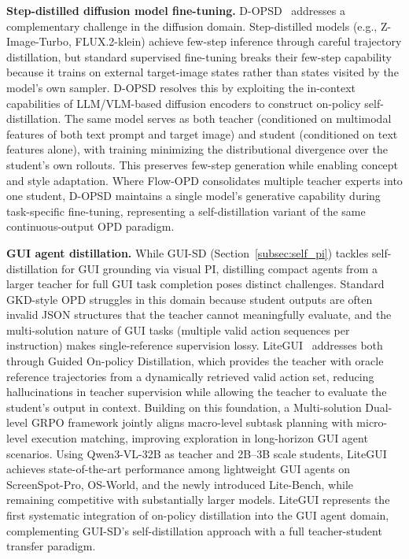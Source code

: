 \documentclass{article} %
\begin{document}
\textbf{Step-distilled diffusion model fine-tuning.} D-OPSD~\citep{jiang2026dopsd} addresses a complementary challenge in the diffusion domain. Step-distilled models (e.g., Z-Image-Turbo, FLUX.2-klein) achieve few-step inference through careful trajectory distillation, but standard supervised fine-tuning breaks their few-step capability because it trains on external target-image states rather than states visited by the model's own sampler. D-OPSD resolves this by exploiting the in-context capabilities of LLM/VLM-based diffusion encoders to construct on-policy self-distillation. The same model serves as both teacher (conditioned on multimodal features of both text prompt and target image) and student (conditioned on text features alone), with training minimizing the distributional divergence over the student's own rollouts. This preserves few-step generation while enabling concept and style adaptation. Where Flow-OPD consolidates multiple teacher experts into one student, D-OPSD maintains a single model's generative capability during task-specific fine-tuning, representing a self-distillation variant of the same continuous-output OPD paradigm.

\textbf{GUI agent distillation.} While GUI-SD (Section~\ref{subsec:self_pi}) tackles self-distillation for GUI grounding via visual PI, distilling compact agents from a larger teacher for full GUI task completion poses distinct challenges. Standard GKD-style OPD struggles in this domain because student outputs are often invalid JSON structures that the teacher cannot meaningfully evaluate, and the multi-solution nature of GUI tasks (multiple valid action sequences per instruction) makes single-reference supervision lossy. LiteGUI~\citep{wu2026litegui} addresses both through Guided On-policy Distillation, which provides the teacher with oracle reference trajectories from a dynamically retrieved valid action set, reducing hallucinations in teacher supervision while allowing the teacher to evaluate the student's output in context. Building on this foundation, a Multi-solution Dual-level GRPO framework jointly aligns macro-level subtask planning with micro-level execution matching, improving exploration in long-horizon GUI agent scenarios. Using Qwen3-VL-32B as teacher and 2B--3B scale students, LiteGUI achieves state-of-the-art performance among lightweight GUI agents on ScreenSpot-Pro, OS-World, and the newly introduced Lite-Bench, while remaining competitive with substantially larger models. LiteGUI represents the first systematic integration of on-policy distillation into the GUI agent domain, complementing GUI-SD's self-distillation approach with a full teacher-student transfer paradigm.
\end{document}
